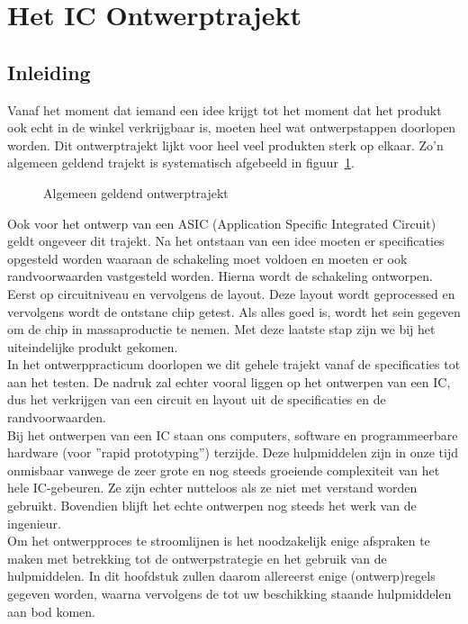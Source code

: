 \section{Het IC Ontwerptrajekt}

\subsection{Inleiding}

Vanaf het moment dat iemand een idee krijgt tot het moment dat het produkt 
ook echt in de winkel verkrijgbaar is, 
moeten heel wat ontwerpstappen doorlopen worden. 
Dit ontwerptrajekt lijkt voor heel veel produkten sterk op elkaar. 
Zo'n algemeen geldend trajekt is systematisch afgebeeld in figuur~\ref{ontw}.

\begin{figure}[bth]
\centerline{}
\caption{Algemeen geldend ontwerptrajekt}
\label{ontw}
\end{figure}

Ook voor het ontwerp van een ASIC (Application Specific Integrated Circuit) geldt ongeveer dit trajekt.
Na het ontstaan van een idee moeten er specificaties opgesteld worden waaraan de schakeling moet voldoen 
en moeten er ook randvoorwaarden vastgesteld worden.
Hierna wordt de schake\-ling ontworpen. Eerst op circuitniveau en vervolgens de layout.
Deze layout wordt geprocessed en vervolgens wordt de ontstane chip getest.
Als alles goed is, wordt het sein gegeven om de chip in massaproductie te nemen.
Met deze laatste stap zijn we bij het uiteindelijke produkt gekomen. \\
In het ontwerppracticum doorlopen we dit gehele trajekt vanaf de specificaties tot aan het testen.
De nadruk zal echter vooral liggen op het ontwerpen van een IC,
dus het verkrijgen van een circuit en layout uit de specificaties en de randvoorwaarden.\\
Bij het ontwerpen van een IC staan ons computers, software en programmeerbare
hardware (voor ''rapid prototyping'') terzijde.
Deze hulpmiddelen zijn in onze tijd onmisbaar 
vanwege de zeer grote en nog steeds groeiende complexiteit van het hele IC-gebeuren. 
Ze zijn echter nutteloos als ze niet met verstand worden gebruikt. 
Bovendien blijft het echte ontwerpen nog steeds het werk van de ingenieur. \\
Om het ontwerpproces te stroomlijnen is het noodzakelijk enige afspraken te maken met betrekking 
tot de ontwerpstrategie en het gebruik van de hulpmiddelen. 
In dit hoofdstuk zullen daarom allereerst enige (ontwerp)regels gegeven worden, 
waarna vervolgens de tot uw beschikking staande hulpmiddelen aan bod komen. 

